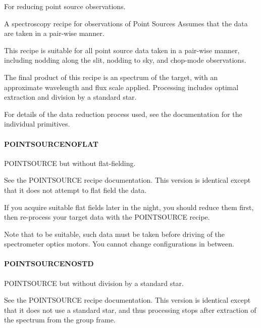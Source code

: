 \documentclass[twoside,11pt]{article}
\renewcommand{\_}{\texttt{\symbol{95}}}
\begin{document}
For reducing point source observations.


\mbox{}


A spectroscopy recipe for observations of Point Sources
Assumes that the data are taken in a pair-wise manner.



This recipe is suitable for all point source data taken in a pair-wise
manner, including nodding along the slit, nodding to sky, and
chop-mode observations.



The final product of this recipe is an spectrum of the target, with an
approximate wavelength and flux scale applied. Processing includes
optimal extraction and division by a standard star.



For details of the data reduction process used, see the documentation
for the individual primitives.

\paragraph{POINT\_SOURCE\_NOFLAT\label{POINT_SOURCE_NOFLAT}}


POINT\_SOURCE but without flat-fielding.


\mbox{}


See the POINT\_SOURCE recipe documentation. This version is identical except
that it does not attempt to flat field the data.



If you acquire suitable flat fields later in the night, you should
reduce them first, then re-process your target data with the
POINT\_SOURCE recipe.



Note that to be suitable, such data must be taken before driving
of the spectrometer optics motors. You cannot change configurations
in between.

\paragraph{POINT\_SOURCE\_NOSTD\label{POINT_SOURCE_NOSTD}}


POINT\_SOURCE but without division by a standard star.


\mbox{}


See the POINT\_SOURCE recipe documentation. This version is identical
except that it does not use a standard star, and thus processing stops
after extraction of the spectrum from the group frame.
\end{document}
